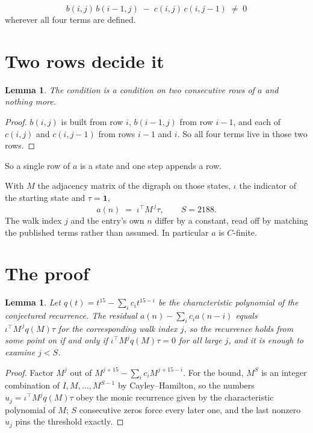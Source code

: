 \documentclass[11pt,a4paper]{article}
\theoremstyle{plain}
\newtheorem{lemma}[theorem]{Lemma}
\theoremstyle{definition}
\begin{document}
\[
b(i,j)\,b(i{-}1,j)\;-\;c(i,j)\,c(i,j{-}1)\;\neq\;0
\]
wherever all four terms are defined.


\section{Two rows decide it}

\begin{lemma}\label{lem:win}
The condition is a condition on two consecutive rows of $a$ and nothing more.
\end{lemma}

\begin{proof}
$b(i,j)$ is built from row $i$, $b(i{-}1,j)$ from row $i-1$, and each of $c(i,j)$ and
$c(i,j{-}1)$ from rows $i-1$ and $i$. So all four terms live in those two rows.
\end{proof}

So a single row of $a$ is a state and one step appends a row.

With $M$ the adjacency matrix of the digraph on those states, $\iota$ the indicator of the
starting state and $\tau=\mathbf{1}$,
\[
a(n)\;=\;\iota^{\!\top}M^{\,j}\tau ,\qquad S=2188.
\]
The walk index $j$ and the entry's own $n$ differ by a constant, read off by matching the
published terms rather than assumed. In particular $a$ is $C$-finite.

\section{The proof}

\begin{lemma}\label{lem:crit}
Let $q(t)=t^{15}-\sum_i c_it^{15-i}$ be the characteristic polynomial of the
conjectured recurrence. The residual $a(n)-\sum_ic_ia(n-i)$ equals
$\iota^{\!\top}M^{\,j}q(M)\tau$ for the corresponding walk index $j$, so the recurrence
holds from some point on if and only if $\iota^{\!\top}M^{j}q(M)\tau=0$ for all large $j$,
and it is enough to examine $j<S$.
\end{lemma}

\begin{proof}
Factor $M^{j}$ out of $M^{j+15}-\sum_ic_iM^{j+15-i}$. For the bound, $M^{S}$
is an integer combination of $I,M,\dots,M^{S-1}$ by Cayley--Hamilton, so the numbers
$u_j=\iota^{\!\top}M^{j}q(M)\tau$ obey the monic recurrence given by the characteristic
polynomial of $M$; $S$ consecutive zeros force every later one, and the last nonzero $u_j$
pins the threshold exactly.
\end{proof}
\end{document}
